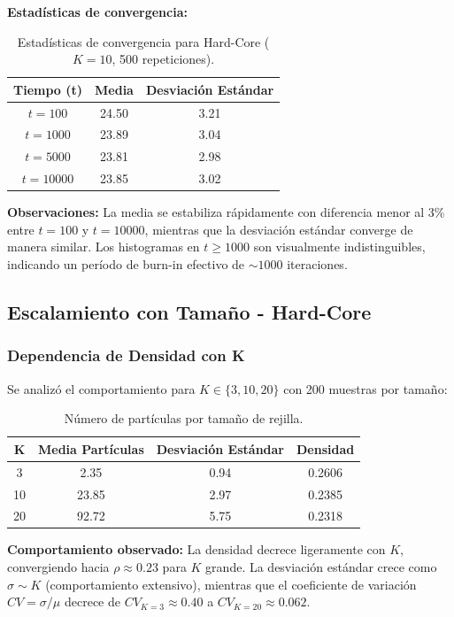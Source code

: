 \textbf{Estadísticas de convergencia:}

\begin{table}[H]
\centering
\begin{tabular}{|c|c|c|}
\hline
\textbf{Tiempo (t)} & \textbf{Media} & \textbf{Desviación Estándar} \\
\hline
$t=100$ & 24.50 & 3.21 \\
$t=1000$ & 23.89 & 3.04 \\
$t=5000$ & 23.81 & 2.98 \\
$t=10000$ & 23.85 & 3.02 \\
\hline
\end{tabular}
\caption{Estadísticas de convergencia para Hard-Core ($K=10$, 500 repeticiones).}
\end{table}

\textbf{Observaciones:} La media se estabiliza rápidamente con diferencia menor al 3\% entre $t=100$ y $t=10000$, mientras que la desviación estándar converge de manera similar. Los histogramas en $t \geq 1000$ son visualmente indistinguibles, indicando un período de burn-in efectivo de $\sim 1000$ iteraciones.

\subsection{Escalamiento con Tamaño - Hard-Core}

\subsubsection{Dependencia de Densidad con K}

Se analizó el comportamiento para $K \in \{3, 10, 20\}$ con 200 muestras por tamaño:

\begin{table}[H]
\centering
\begin{tabular}{|c|c|c|c|}
\hline
\textbf{K} & \textbf{Media Partículas} & \textbf{Desviación Estándar} & \textbf{Densidad} \\
\hline
3 & 2.35 & 0.94 & 0.2606 \\
10 & 23.85 & 2.97 & 0.2385 \\
20 & 92.72 & 5.75 & 0.2318 \\
\hline
\end{tabular}
\caption{Número de partículas por tamaño de rejilla.}
\end{table}

\textbf{Comportamiento observado:} La densidad decrece ligeramente con $K$, convergiendo hacia $\rho \approx 0.23$ para $K$ grande. La desviación estándar crece como $\sigma \sim K$ (comportamiento extensivo), mientras que el coeficiente de variación $CV = \sigma/\mu$ decrece de $CV_{K=3} \approx 0.40$ a $CV_{K=20} \approx 0.062$.

